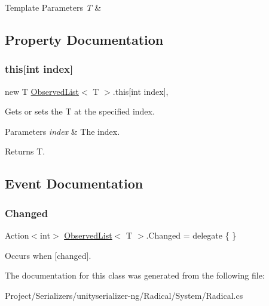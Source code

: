\begin{DoxyTemplParams}{Template Parameters}
{\em T} & \\
\hline
\end{DoxyTemplParams}


\subsection{Property Documentation}
\mbox{\label{class_observed_list_a87636f926bf60362db38cddc0740960b}} 
\subsubsection{\texorpdfstring{this[int index]}{this[int index]}}
{\footnotesize\ttfamily new T \hyperlink{class_observed_list}{Observed\+List}$<$ T $>$.this\mbox{[}int index\mbox{]}\hspace{0.3cm}{\ttfamily [get]}, {\ttfamily [set]}}



Gets or sets the T at the specified index. 


\begin{DoxyParams}{Parameters}
{\em index} & The index.\\
\hline
\end{DoxyParams}
\begin{DoxyReturn}{Returns}
T.
\end{DoxyReturn}


\subsection{Event Documentation}
\mbox{\label{class_observed_list_a0f2e4ec62d0fbcb270aab7a81005e7b1}} 
\subsubsection{\texorpdfstring{Changed}{Changed}}
{\footnotesize\ttfamily Action$<$int$>$ \hyperlink{class_observed_list}{Observed\+List}$<$ T $>$.Changed = delegate \{ \}}



Occurs when \mbox{[}changed\mbox{]}. 



The documentation for this class was generated from the following file\+:\begin{DoxyCompactItemize}
\item 
Project/\+Serializers/unityserializer-\/ng/\+Radical/\+System/Radical.\+cs\end{DoxyCompactItemize}
